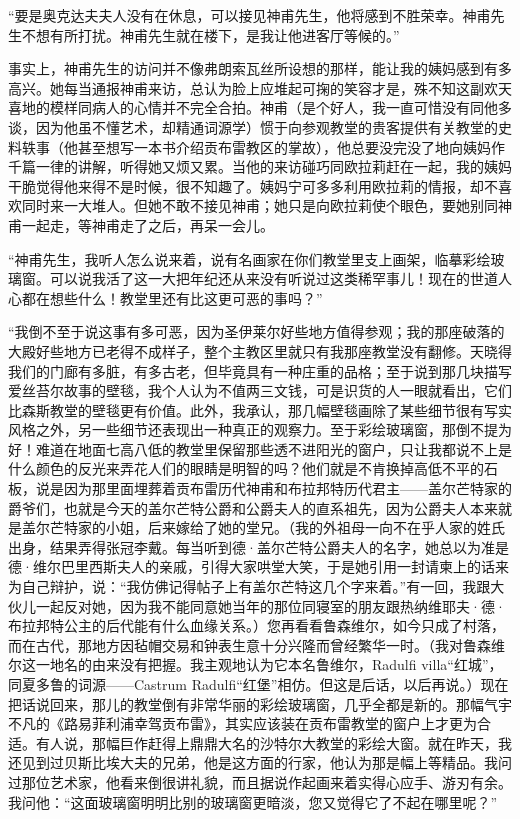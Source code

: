\par “要是奥克达夫夫人没有在休息，可以接见神甫先生，他将感到不胜荣幸。神甫先生不想有所打扰。神甫先生就在楼下，是我让他进客厅等候的。”
\par 事实上，神甫先生的访问并不像弗朗索瓦丝所设想的那样，能让我的姨妈感到有多高兴。她每当通报神甫来访，总认为脸上应堆起可掬的笑容才是，殊不知这副欢天喜地的模样同病人的心情并不完全合拍。神甫（是个好人，我一直可惜没有同他多谈，因为他虽不懂艺术，却精通词源学）惯于向参观教堂的贵客提供有关教堂的史料轶事（他甚至想写一本书介绍贡布雷教区的掌故），他总要没完没了地向姨妈作千篇一律的讲解，听得她又烦又累。当他的来访碰巧同欧拉莉赶在一起，我的姨妈干脆觉得他来得不是时候，很不知趣了。姨妈宁可多多利用欧拉莉的情报，却不喜欢同时来一大堆人。但她不敢不接见神甫；她只是向欧拉莉使个眼色，要她别同神甫一起走，等神甫走了之后，再呆一会儿。
\par “神甫先生，我听人怎么说来着，说有名画家在你们教堂里支上画架，临摹彩绘玻璃窗。可以说我活了这一大把年纪还从来没有听说过这类稀罕事儿！现在的世道人心都在想些什么！教堂里还有比这更可恶的事吗？”
\par “我倒不至于说这事有多可恶，因为圣伊莱尔好些地方值得参观；我的那座破落的大殿好些地方已老得不成样子，整个主教区里就只有我那座教堂没有翻修。天晓得我们的门廊有多脏，有多古老，但毕竟具有一种庄重的品格；至于说到那几块描写爱丝苔尔故事的壁毯，我个人认为不值两三文钱，可是识货的人一眼就看出，它们比森斯教堂的壁毯更有价值。此外，我承认，那几幅壁毯画除了某些细节很有写实风格之外，另一些细节还表现出一种真正的观察力。至于彩绘玻璃窗，那倒不提为好！难道在地面七高八低的教堂里保留那些透不进阳光的窗户，只让我都说不上是什么颜色的反光来弄花人们的眼睛是明智的吗？他们就是不肯换掉高低不平的石板，说是因为那里面埋葬着贡布雷历代神甫和布拉邦特历代君主——盖尔芒特家的爵爷们，也就是今天的盖尔芒特公爵和公爵夫人的直系祖先，因为公爵夫人本来就是盖尔芒特家的小姐，后来嫁给了她的堂兄。（我的外祖母一向不在乎人家的姓氏出身，结果弄得张冠李戴。每当听到德·盖尔芒特公爵夫人的名字，她总以为准是德·维尔巴里西斯夫人的亲戚，引得大家哄堂大笑，于是她引用一封请柬上的话来为自己辩护，说：“我仿佛记得帖子上有盖尔芒特这几个字来着。”有一回，我跟大伙儿一起反对她，因为我不能同意她当年的那位同寝室的朋友跟热纳维耶夫·德·布拉邦特公主的后代能有什么血缘关系。）您再看看鲁森维尔，如今只成了村落，而在古代，那地方因毡帽交易和钟表生意十分兴隆而曾经繁华一时。（我对鲁森维尔这一地名的由来没有把握。我主观地认为它本名鲁维尔，Radulfi villa“红城”，同夏多鲁的词源——Castrum Radulfi“红堡”相仿。但这是后话，以后再说。）现在把话说回来，那儿的教堂倒有非常华丽的彩绘玻璃窗，几乎全都是新的。那幅气宇不凡的《路易菲利浦幸驾贡布雷》，其实应该装在贡布雷教堂的窗户上才更为合适。有人说，那幅巨作赶得上鼎鼎大名的沙特尔大教堂的彩绘大窗。就在昨天，我还见到过贝斯比埃大夫的兄弟，他是这方面的行家，他认为那是幅上等精品。我问过那位艺术家，他看来倒很讲礼貌，而且据说作起画来着实得心应手、游刃有余。我问他：“这面玻璃窗明明比别的玻璃窗更暗淡，您又觉得它了不起在哪里呢？”
